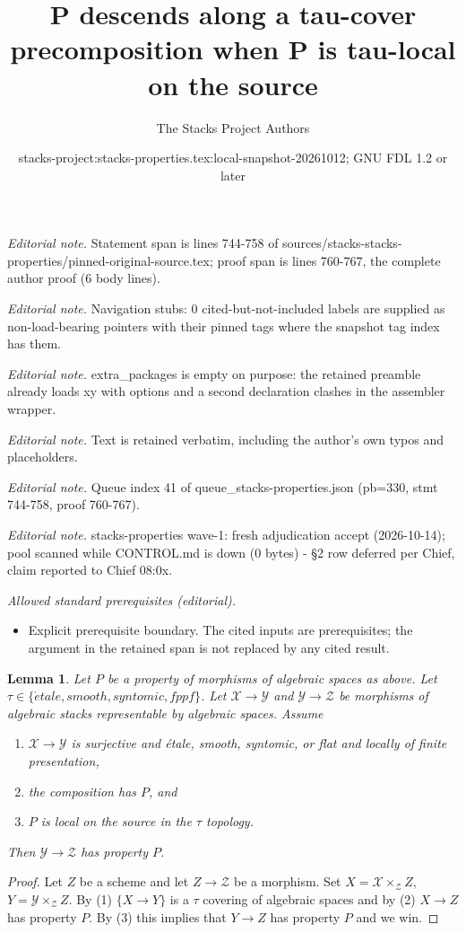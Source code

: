 \documentclass[10pt,a4paper]{amsart}
\title{P descends along a tau-cover precomposition when P is tau-local on the source}
\author{The Stacks Project Authors}
\date{stacks-project:stacks-properties.tex:local-snapshot-20261012; GNU FDL 1.2 or later}
\theoremstyle{plain}
\newtheorem{lemma}[subsection]{Lemma}
\theoremstyle{definition}
\theoremstyle{remark}
\numberwithin{equation}{subsection}
\def\etale{{\acute{e}tale}}
\begin{document}
\maketitle
\noindent\textit{Editorial note.} Statement span is lines 744-758 of sources/stacks-stacks-properties/pinned-original-source.tex; proof span is lines 760-767, the complete author proof (6 body lines).\par\medskip
\noindent\textit{Editorial note.} Navigation stubs: 0 cited-but-not-included labels are supplied as non-load-bearing pointers with their pinned tags where the snapshot tag index has them.\par\medskip
\noindent\textit{Editorial note.} extra\_packages is empty on purpose: the retained preamble already loads xy with options and a second declaration clashes in the assembler wrapper.\par\medskip
\noindent\textit{Editorial note.} Text is retained verbatim, including the author's own typos and placeholders.\par\medskip
\noindent\textit{Editorial note.} Queue index 41 of queue\_stacks-properties.json (pb=330, stmt 744-758, proof 760-767).\par\medskip
\noindent\textit{Editorial note.} stacks-properties wave-1: fresh adjudication accept (2026-10-14); pool scanned while CONTROL.md is down (0 bytes) - §2 row deferred per Chief, claim reported to Chief 08:0x.\par\medskip
\noindent\textit{Allowed standard prerequisites (editorial).}\begin{itemize}
\item Explicit prerequisite boundary. The cited inputs are prerequisites; the argument in the retained span is not replaced by any cited result.
\end{itemize}\medskip
\begin{lemma}
\label{lemma-check-property-after-precomposing}
Let $P$ be a property of morphisms of algebraic spaces as above.
Let $\tau \in \{\etale, smooth, syntomic, fppf\}$.
Let $\mathcal{X} \to \mathcal{Y}$ and $\mathcal{Y} \to \mathcal{Z}$
be morphisms of algebraic stacks representable by algebraic spaces.
Assume
\begin{enumerate}
\item $\mathcal{X} \to \mathcal{Y}$ is surjective and
\'etale, smooth, syntomic, or flat and locally of finite presentation,
\item the composition has $P$, and
\item $P$ is local on the source in the $\tau$ topology.
\end{enumerate}
Then $\mathcal{Y} \to \mathcal{Z}$ has property $P$.
\end{lemma}

\begin{proof}
Let $Z$ be a scheme and let $Z \to \mathcal{Z}$ be a morphism.
Set $X = \mathcal{X} \times_\mathcal{Z} Z$,
$Y = \mathcal{Y} \times_\mathcal{Z} Z$. By (1) $\{X \to Y\}$
is a $\tau$ covering of algebraic spaces and by (2) $X \to Z$ has property
$P$. By (3) this implies that $Y \to Z$ has property $P$
and we win.
\end{proof}
\end{document}

